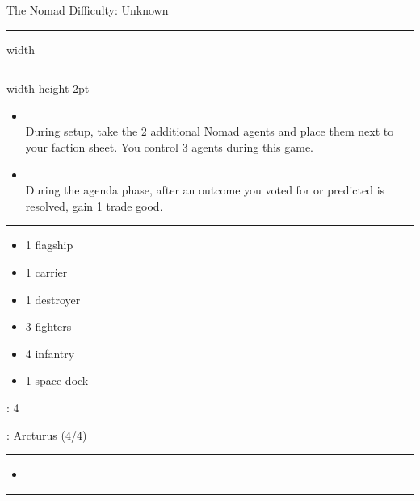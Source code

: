 \newpage
{\handel\Huge The Nomad} \hfill {\Large Difficulty: Unknown} \vspace{-4pt}\\
\hrule width \hsize \kern 1mm \hrule width \hsize height 2pt


\begin{multicols}{2}


\begin{itemize}
\item {}\\
During setup, take the 2 additional Nomad agents and place them next to your faction sheet. You control 3 agents during this game.
\item {}\\
During the agenda phase, after an outcome you voted for or predicted is resolved, gain 1 trade good.
\end{itemize}


\vspace{-10pt}\rule{\hsize}{0.4pt}\vspace{5pt}


\vspace{-5pt}
\begin{multicols}{2}
\begin{itemize}
\item 1 flagship
\item 1 carrier
\item 1 destroyer
\item 3 fighters
\item 4 infantry
\item 1 space dock
\end{itemize}
\end{multicols}

\vspace{-5pt}
: 4

\vspace{2pt}
: Arcturus (4/4)

\rule{\hsize}{0.4pt}\vspace{5pt}


\begin{itemize}
\item \sling
\end{itemize}

\vspace{-10pt}\rule{\hsize}{0.4pt}\vspace{5pt}


\end{multicols}
